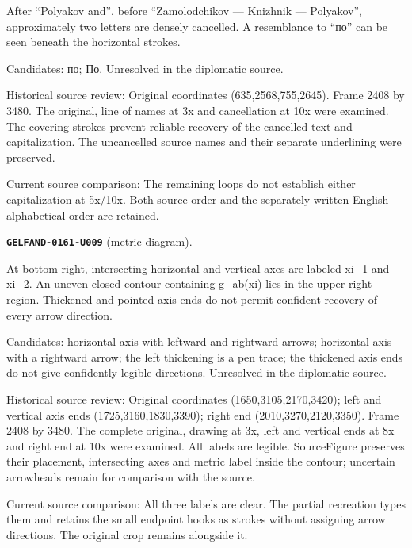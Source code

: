 After “Polyakov and”, before “Zamolodchikov — Knizhnik — Polyakov”, approximately two letters are densely cancelled. A resemblance to “по” can be seen beneath the horizontal strokes.\par
Candidates: по; По. Unresolved in the diplomatic source.\par
Historical source review: Original coordinates (635,2568,755,2645). Frame 2408 by 3480. The original, line of names at 3x and cancellation at 10x were examined. The covering strokes prevent reliable recovery of the cancelled text and capitalization. The uncancelled source names and their separate underlining were preserved.\par
Current source comparison: The remaining loops do not establish either capitalization at 5x/10x. Both source order and the separately written English alphabetical order are retained.\par\medskip
\par\noindent\leavevmode{}\label{GELFAND-0161-U009}\label{GELFAND-P001486:metric-diagram}\textbf{\texttt{GELFAND-0161-U009}} (metric-diagram).\nopagebreak[4]\par
At bottom right, intersecting horizontal and vertical axes are labeled xi\_1 and xi\_2. An uneven closed contour containing g\_ab(xi) lies in the upper-right region. Thickened and pointed axis ends do not permit confident recovery of every arrow direction.\par
Candidates: horizontal axis with leftward and rightward arrows; horizontal axis with a rightward arrow; the left thickening is a pen trace; the thickened axis ends do not give confidently legible directions. Unresolved in the diplomatic source.\par
Historical source review: Original coordinates (1650,3105,2170,3420); left and vertical axis ends (1725,3160,1830,3390); right end (2010,3270,2120,3350). Frame 2408 by 3480. The complete original, drawing at 3x, left and vertical ends at 8x and right end at 10x were examined. All labels are legible. SourceFigure preserves their placement, intersecting axes and metric label inside the contour; uncertain arrowheads remain for comparison with the source.\par
Current source comparison: All three labels are clear. The partial recreation types them and retains the small endpoint hooks as strokes without assigning arrow directions. The original crop remains alongside it.\par\medskip
